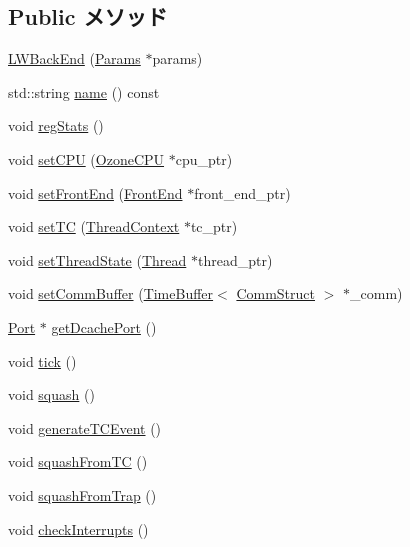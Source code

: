 \subsection*{Public メソッド}
\begin{DoxyCompactItemize}
\item 
\hyperlink{classLWBackEnd_a547c62cea335ccc135b28bf60afc1a65}{LWBackEnd} (\hyperlink{classLWBackEnd_a818e103eae798a24a06a0a34631849ea}{Params} $\ast$params)
\item 
std::string \hyperlink{classLWBackEnd_a37627d5d5bba7f4a8690c71c2ab3cb07}{name} () const 
\item 
void \hyperlink{classLWBackEnd_a4dc637449366fcdfc4e764cdf12d9b11}{regStats} ()
\item 
void \hyperlink{classLWBackEnd_ab8056057b67b41f234f56940cc115cc1}{setCPU} (\hyperlink{classOzoneCPU}{OzoneCPU} $\ast$cpu\_\-ptr)
\item 
void \hyperlink{classLWBackEnd_a122009fa2730cee3898ac945227da8eb}{setFrontEnd} (\hyperlink{classFrontEnd}{FrontEnd} $\ast$front\_\-end\_\-ptr)
\item 
void \hyperlink{classLWBackEnd_ac6ccaaea6ac518cab92f71723b5a739e}{setTC} (\hyperlink{classThreadContext}{ThreadContext} $\ast$tc\_\-ptr)
\item 
void \hyperlink{classLWBackEnd_a850bea4a9b9f631e7b6a4c7dc92f662a}{setThreadState} (\hyperlink{structOzoneThreadState}{Thread} $\ast$thread\_\-ptr)
\item 
void \hyperlink{classLWBackEnd_aeabdb9f0aae07df67c3029f8fddb2693}{setCommBuffer} (\hyperlink{classTimeBuffer}{TimeBuffer}$<$ \hyperlink{classLWBackEnd_abdf3026ccc30c2ed3cb77dbe3cfbacad}{CommStruct} $>$ $\ast$\_\-comm)
\item 
\hyperlink{classPort}{Port} $\ast$ \hyperlink{classLWBackEnd_a32e64f82b805fe23a17b01dda0f44fb0}{getDcachePort} ()
\item 
void \hyperlink{classLWBackEnd_a873dd91783f9efb4a590aded1f70d6b0}{tick} ()
\item 
void \hyperlink{classLWBackEnd_a3c68c455d9207edd23ae3bcb7971e653}{squash} ()
\item 
void \hyperlink{classLWBackEnd_aee57f4aad9f2308dcc12325319c170d5}{generateTCEvent} ()
\item 
void \hyperlink{classLWBackEnd_a24cd8db837a73b879041bf33da7b2064}{squashFromTC} ()
\item 
void \hyperlink{classLWBackEnd_a63c6cc9b9d0507c286d035e92a1bc4f4}{squashFromTrap} ()
\item 
void \hyperlink{classLWBackEnd_a53f309de2e633a8788fc67ba03d23675}{checkInterrupts} ()

\end{DoxyCompactItemize}
